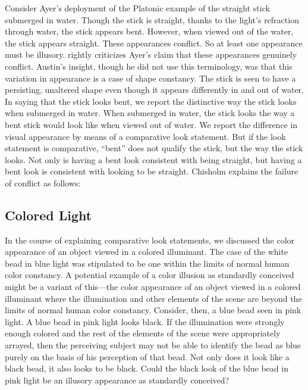 \documentclass[12pt]{article}
\begin{document}
Consider Ayer's deployment of the Platonic example of the straight stick submerged in water. Though the stick is straight, thanks to the light's refraction through water, the stick appears bent. However, when viewed out of the water, the stick appears straight. These appearances conflict. So at least one appearance must be illusory. \citet{Austin:1962lr} rightly criticizes Ayer's claim that these appearances genuinely conflict. Austin's insight, though he did not use this terminology, was that this variation in appearance is a case of shape constancy.  The stick is seen to have a persisting, unaltered shape even though it appears differently in and out of water. In saying that the stick looks bent, we report the distinctive way the stick looks when submerged in water. When submerged in water, the stick looks the way a bent stick would look like when viewed out of water. We report the difference in visual appearance by means of a comparative look statement. But if the look statement is comparative, ``bent'' does not qualify the stick, but the way the stick looks. Not only is having a bent look consistent with being straight, but having a bent look is consistent with looking to be straight. Chisholm explains the failure of conflict as follows:
\begin{quote}
\end{quote}




\subsection{Colored Light}\label{sub:colored_illuminants} %

In the course of explaining comparative look statements, we discussed the color appearance of an object viewed in a colored illuminant. The case of the white bead in blue light was stipulated to be one within the limits of normal human color constancy. A potential example of a color illusion as standardly conceived might be a variant of this---the color appearance of an object viewed in a colored illuminant where the illumination and other elements of the scene are beyond the limits of normal human color constancy. Consider, then, a blue bead seen in pink light. A blue bead in pink light looks black. If the illumination were strongly enough colored and the rest of the elements of the scene were appropriately arrayed, then the perceiving subject may not be able to identify the bead as blue purely on the basis of his perception of that bead. Not only does it look like a black bead, it also looks to be black. Could the black look of the blue bead in pink light be an illusory appearance as standardly conceived? 
\end{document}
